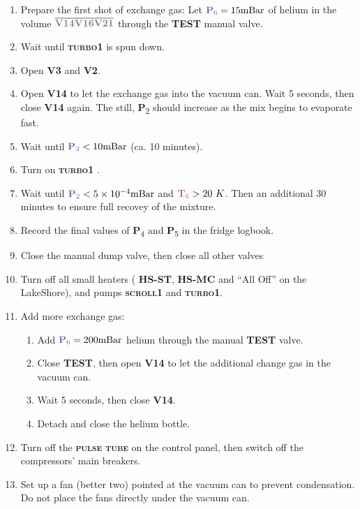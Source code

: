 \documentclass{article}[18pt,A4]
\newcommand{\mBar}{\mathrm{mBar}}
\newcommand{\thing}[1]{{\color{gray}\textsc{ \textbf{#1}}}}
\newcommand{\valve}[1]{{\color{gray}\textbf{V#1}}}
\newcommand{\pressure}[1]{{\color{pressurecolor}\textbf{P}\textsubscript{#1}}}
\newcommand{\temperature}[1]{{\color{temperaturecolor}\textbf{T}\textsubscript{#1}}}
\newcommand{\volume}[1]{\ensuremath{\overline{#1}}}
\begin{document}
\begin{enumerate}
\begin{enumerate}
        \item Flush the volume two more times, then close \valve{21}.
        \end{enumerate}
    \item Prepare the first shot of exchange gas: Let $\pressure{6} = 15 \mBar$ of helium in the
    volume \volume{\valve{14} \valve{16} \valve{21}} through the \thing{TEST} manual valve.
    \item Wait until \thing{turbo1} is spun down.
    \item Open \valve{3} and \valve{2}. 
    \item Open \valve{14} to let the exchange gas into the vacuum can. Wait 5 seconds, then close \valve{14} again.
    The still, \pressure{2} should increase as the mix begins to evaporate fast.
    \item Wait until $\pressure{2} < 10 \mBar$ (ca. 10 minutes).
    \item Turn on \thing{turbo1} .
    \item Wait until $\pressure{2} < 5\times10^{-4} \mBar$ and $\temperature{6} > 20~K$. Then an additional 30 minutes to ensure full recovey of the mixture.
    \item Record the final values of \pressure{4} and \pressure{5} in the fridge logbook.
    \item Close the manual dump valve, then close all other valves
    \item Turn off all small heaters (\thing{HS-ST}, \thing{HS-MC} and ``All Off'' on the LakeShore), and pumps \thing{scroll1} and \thing{turbo1}. 
    \item Add more exchange gas:
        \begin{enumerate}
        \item Add $\pressure{6} = 200 \mBar$ helium through the manual \thing{TEST} valve. 
        \item Close \thing{TEST}, then open \valve{14} to let the additional change gas in the vacuum can.
        \item Wait 5 seconds, then close \valve{14}.
        \item Detach and close the helium bottle.
        \end{enumerate}
    \item Turn off the \thing{pulse tube} on the control panel, then switch off the compressors' main breakers.
    \item Set up a fan (better two) pointed at the vacuum can to prevent condensation. Do not place the fans directly under the vacuum can.

\end{enumerate}
\end{document}
